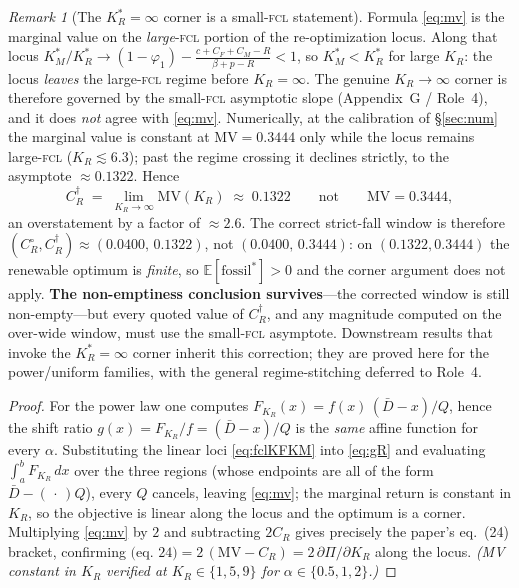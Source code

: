 \documentclass[11pt,reqno]{amsart}
\theoremstyle{plain}
\theoremstyle{definition}
\theoremstyle{remark}
\newtheorem{remark}{Remark}
\newcommand{\KR}{K_R}
\newcommand{\KRs}{K_R^{*}}
\newcommand{\KMs}{K_M^{*}}
\newcommand{\Dbar}{\bar D}
\newcommand{\CM}{C_M}
\newcommand{\CF}{C_F}
\newcommand{\CR}{C_R}
\newcommand{\bp}{\beta+p}
\newcommand{\FKR}{F_{\!\KR}}
\newcommand{\E}{\mathbb{E}}
\begin{document}
\begin{remark}[The $\KRs=\infty$ corner is a small-\textsc{fcl} statement]\label{rem:knifecaveat}
Formula \eqref{eq:mv} is the marginal value on the \emph{large}-\textsc{fcl} portion of
the re-optimization locus. Along that locus $\KMs/\KRs\to(1-\varphi_1)-\tfrac{c+\CF+\CM-R}{\bp-R}<1$,
so $\KMs<\KRs$ for large $\KR$: the locus \emph{leaves} the large-\textsc{fcl} regime before
$\KR=\infty$. The genuine $\KR\to\infty$ corner is therefore governed by the
small-\textsc{fcl} asymptotic slope (Appendix~G / Role~4), and it does \emph{not} agree
with \eqref{eq:mv}. Numerically, at the calibration of \S\ref{sec:num} the marginal value
is constant at $\mathrm{MV}=0.3444$ only while the locus remains large-\textsc{fcl}
($\KR\lesssim6.3$); past the regime crossing it declines strictly, to the asymptote
$\approx0.1322$. Hence
\[
  \CR^{\dagger}\;=\;\lim_{\KR\to\infty}\mathrm{MV}(\KR)\;\approx\;0.1322
  \qquad\text{not}\qquad \mathrm{MV}=0.3444 ,
\]
an overstatement by a factor of $\approx2.6$. The correct strict-fall window is therefore
$(\CR^{\circ},\CR^{\dagger})\approx(0.0400,\,0.1322)$, not $(0.0400,\,0.3444)$: on
$(0.1322,0.3444)$ the renewable optimum is \emph{finite}, so $\E[\text{fossil}^{*}]>0$ and
the corner argument does not apply. \textbf{The non-emptiness conclusion survives}---the
corrected window is still non-empty---but every quoted value of $\CR^{\dagger}$, and any
magnitude computed on the over-wide window, must use the small-\textsc{fcl} asymptote.
Downstream results that invoke the $\KRs=\infty$ corner inherit this correction; they are
proved here for the power/uniform families, with the general regime-stitching deferred to
Role~4.
\end{remark}

\begin{proof}
For the power law one computes $\FKR(x)=f(x)\,(\Dbar-x)/Q$, hence the shift ratio
$g(x)=\FKR/f=(\Dbar-x)/Q$ is the \emph{same} affine function for every $\alpha$.
Substituting the linear loci \eqref{eq:fclKFKM} into \eqref{eq:gR} and evaluating
$\int_a^b\FKR\,dx$ over the three regions (whose endpoints are all of the form
$\Dbar-(\,\cdot\,)Q$), every $Q$ cancels, leaving \eqref{eq:mv}; the marginal
return is constant in $\KR$, so the objective is linear along the locus and the
optimum is a corner. Multiplying \eqref{eq:mv} by $2$ and subtracting $2\CR$
gives precisely the paper's eq.\ (24) bracket, confirming
$\text{(eq.\ 24)}=2\,(\mathrm{MV}-\CR)=2\,\partial\Pi/\partial\KR$ along the
locus. \emph{(MV constant in $\KR$ verified at $\KR\in\{1,5,9\}$ for
$\alpha\in\{0.5,1,2\}$.)}
\end{proof}
\end{document}
